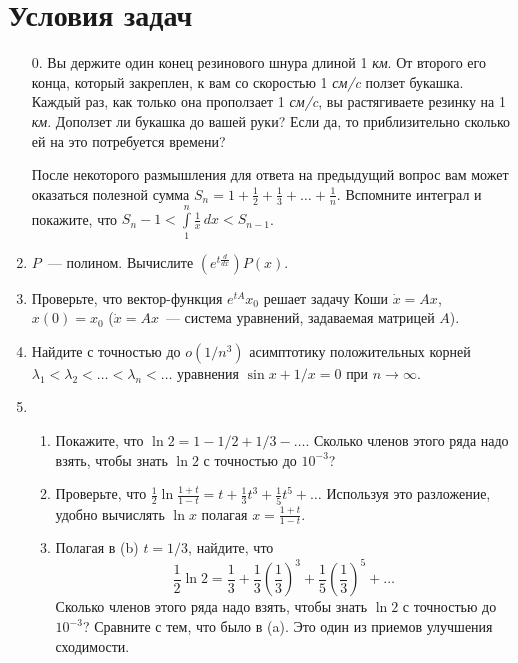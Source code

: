 \documentclass[a4paper]{article}
\begin{document}
\medskip\dmvntrail

\newpage

\section*{Условия задач}

\begin{enumerate}
  \item[0.] Вы держите один конец резинового шнура длиной 1 \textsl{км}. От
  второго его конца, который закреплен, к вам со скоростью 1 \textsl{см/c}
  ползет букашка. Каждый раз, как только она проползает 1
  \textsl{см/c}, вы растягиваете резинку на 1 \textsl{км}. Доползет
  ли букашка до вашей руки? Если да, то приблизительно сколько ей на
  это потребуется времени?

  После некоторого размышления для ответа на предыдущий вопрос вам
  может оказаться полезной сумма $S_n=1+\frac{1}{2}+\frac{1}{3}+\ldots+
  \frac{1}{n}$. Вспомните интеграл и покажите, что $S_n-1<\int\limits_1^n
  \frac{1}{x}\,dx<S_{n-1}$.
  \item $P$~--- полином. Вычислите $(e^{t\frac{d}{dx}})P(x)$.
  \item Проверьте, что вектор-функция $e^{tA}x_0$ решает задачу Коши
  $\dot{x}=Ax$, $x(0)=x_0$ ($\dot{x}=Ax$~--- система уравнений, задаваемая матрицей
  $A$).
  \item Найдите с точностью до $o(1/n^3)$ асимптотику положительных
  корней $\lambda_1<\lambda_2<\ldots<\lambda_n<\ldots$ уравнения $\sin x +
  1/x=0$ при $n\rightarrow\infty$.
  \item \begin{enumerate}
          \item Покажите, что $\ln 2=1-1/2+1/3-\ldots$. Сколько
          членов этого ряда надо взять, чтобы знать $\ln 2$ с
          точностью до $10^{-3}$?
          \item Проверьте, что $\frac{1}{2}\ln\frac{1+t}{1-t}=t+\frac{1}{3}t^3+
          \frac{1}{5}t^5+\ldots$ Используя это разложение, удобно
          вычислять $\ln x$ полагая $x=\frac{1+t}{1-t}$.
          \item Полагая в (b) $t=1/3$, найдите, что
          $$\frac{1}{2}\ln 2=\frac{1}{3}+\frac{1}{3}\left(\frac{1}{3}\right)^3
          +\frac{1}{5}\left(\frac{1}{3}\right)^5+\ldots$$
          Сколько членов этого ряда надо взять, чтобы знать $\ln 2$ с
          точностью до $10^{-3}$? Сравните с тем, что было в (a).
          Это один из приемов улучшения сходимости.
        \end{enumerate}

\end{enumerate}
\end{document}
